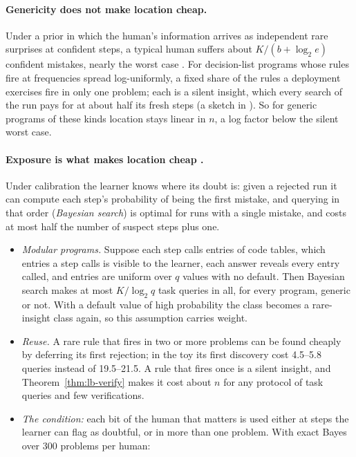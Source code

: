 \documentclass[11pt]{article}
\theoremstyle{definition}
\theoremstyle{remark}
\newcommand{\K}{K}
\begin{document}
\paragraph{Genericity does not make location cheap.} Under a prior in which the human's information arrives as independent rare surprises at confident steps, a typical human suffers about $\K/(b+\log_2e)$ confident mistakes, nearly the worst case \cite{threadGA}. For decision-list programs whose rules fire at frequencies spread log-uniformly, a fixed share of the rules a deployment exercises fire in only one problem; each is a silent insight, which every search of the run pays for at about half its fresh steps (a sketch in \cite{threadGB}). So for generic programs of these kinds location stays linear in $n$, a log factor below the silent worst case.

\paragraph{Exposure is what makes location cheap \cite{threadGB}.} Under calibration the learner knows where its doubt is: given a rejected run it can compute each step's probability of being the first mistake, and querying in that order (\emph{Bayesian search}) is optimal for runs with a single mistake, and costs at most half the number of suspect steps plus one.
\begin{itemize}[nosep]
\item \emph{Modular programs.} Suppose each step calls entries of code tables, which entries a step calls is visible to the learner, each answer reveals every entry called, and entries are uniform over $q$ values with no default. Then Bayesian search makes at most $\K/\log_2q$ task queries in all, for every program, generic or not. With a default value of high probability the class becomes a rare-insight class again, so this assumption carries weight.
\item \emph{Reuse.} A rare rule that fires in two or more problems can be found cheaply by deferring its first rejection; in the toy its first discovery cost 4.5--5.8 queries instead of 19.5--21.5. A rule that fires once is a silent insight, and Theorem~\ref{thm:lb-verify} makes it cost about $n$ for any protocol of task queries and few verifications.
\item \emph{The condition:} each bit of the human that matters is used either at steps the learner can flag as doubtful, or in more than one problem. With exact Bayes over 300 problems per human:
\end{itemize}
\end{document}
